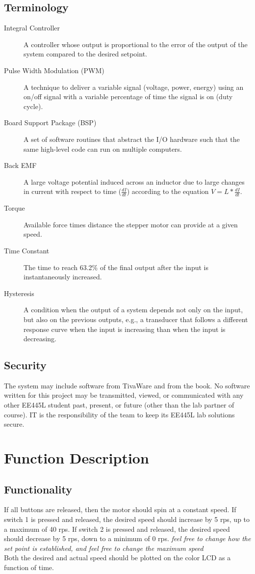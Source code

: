 \documentclass{article}
\begin{document}
	\subsection{Terminology}
		\begin{description}
			\item[Integral Controller]
				A controller whose output is proportional to the error of the output of the system compared to the desired setpoint.
			\item[Pulse Width Modulation (PWM)]
				A technique to deliver a variable signal (voltage, power, energy) using an on/off signal with a variable percentage of time the signal is on (duty cycle).
			\item[Board Support Package (BSP)]
				A set of software routines that abstract the I/O hardware such that the same high-level code can run on multiple computers.
			\item[Back EMF]
				A large voltage potential induced across an inductor due to large changes in current with respect to time ($\frac{dI}{dt}$) according to the equation $V=L*\frac{dI}{dt}$.
			\item[Torque]
				Available force times distance the stepper motor can provide at a given speed.
			\item[Time Constant]
				The time to reach 63.2\% of the final output after the input is instantaneously increased.
			\item[Hysteresis]
				A condition when the output of a system depends not only on the input, but also on the previous outputs, e.g., a transducer that follows a different response curve when the input is increasing than when the input is decreasing.
		\end{description}
	\subsection{Security}
		The system may include software from TivaWare and from the book. No software written for this project may be transmitted, viewed, or communicated with any other EE445L student past, present, or future (other than the lab partner of course). IT is the responsibility of the team to keep its EE445L lab solutions secure.
\section{Function Description}

	\subsection{Functionality}
		If all buttons are released, then the motor should spin at a constant speed. If switch 1 is pressed and released, the desired speed should increase by 5 rps, up to a maximum of 40 rps. If switch 2 is pressed and released, the desired speed should decrease by 5 rps, down to a minimum of 0 rps. \textit{feel free to change how the set point is established, and feel free to change the maximum speed}\\
		Both the desired and actual speed should be plotted on the color LCD as a function of time.
\end{document}
